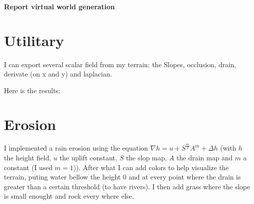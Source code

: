 \documentclass[a4paper,12pt]{article}
\date{\today}
\begin{document}
\pagestyle{fancy}
\begin{center}
\textbf{\huge Report virtual world generation}
\end{center}

\pagestyle{fancy}


\section*{Utilitary}

\paragraph{} I can export several scalar field from my terrain: the Slopes, occlusion, drain, derivate (on x and y) and laplacian.

Here is the results:

\section*{Erosion}

\paragraph{} I implemented a rain erosion using the equation $\nabla h = u + S^{\frac{m}{2}}A^m+ \Delta h$ (with $h$ the height field, $u$ the uplift constant, $S$ the slop map, $A$ the drain map and $m$ a constant (I used $m=1$)). After what I can add colors to help visualize the terrain, puting water bellow the height $0$ and at every point where the drain is greater than a certain threshold (to have rivers). I then add grass where the slope is small enought and rock every where else.
\end{document}
